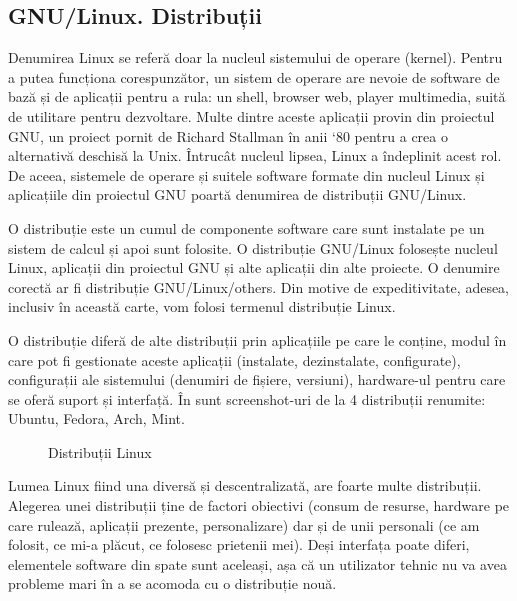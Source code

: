\subsection{GNU/Linux. Distribuții}
\label{sec:intro:distros}

Denumirea Linux se referă doar la nucleul sistemului de operare (kernel). Pentru a putea funcționa corespunzător, un sistem de operare are nevoie de software de bază și de aplicații pentru a rula: un shell, browser web, player multimedia, suită de utilitare pentru dezvoltare. Multe dintre aceste aplicații provin din proiectul GNU, un proiect pornit de Richard Stallman în anii ‘80 pentru a crea o alternativă deschisă la Unix. Întrucât nucleul lipsea, Linux a îndeplinit acest rol. De aceea, sistemele de operare și suitele software formate din nucleul Linux și aplicațiile din proiectul GNU poartă denumirea de distribuții GNU/Linux.

O distribuție este un cumul de componente software care sunt instalate pe un sistem de calcul și apoi sunt folosite. O distribuție GNU/Linux folosește nucleul Linux, aplicații din proiectul GNU și alte aplicații din alte proiecte. O denumire corectă ar fi distribuție GNU/Linux/others. Din motive de expeditivitate, adesea, inclusiv în această carte, vom folosi termenul distribuție Linux.

O distribuție diferă de alte distribuții prin aplicațiile pe care le conține, modul în care pot fi gestionate aceste aplicații (instalate, dezinstalate, configurate), configurații ale sistemului (denumiri de fișiere, versiuni), hardware-ul pentru care se oferă suport și interfață. În  sunt screenshot-uri de la 4 distribuții renumite: Ubuntu, Fedora, Arch, Mint.

\begin{figure}[htbp]
  \centering
  \def\svgwidth{\columnwidth}
  
  \caption{Distribuții Linux}
  \label{fig:intro:distros}
\end{figure}

Lumea Linux fiind una diversă și descentralizată, are foarte multe distribuții.  Alegerea unei distribuții ține de factori obiectivi (consum de resurse, hardware pe care rulează, aplicații prezente, personalizare) dar și de unii personali (ce am folosit, ce mi-a plăcut, ce folosesc prietenii mei). Deși interfața poate diferi, elementele software din spate sunt aceleași, așa că un utilizator tehnic nu va avea probleme mari în a se acomoda cu o distribuție nouă.

